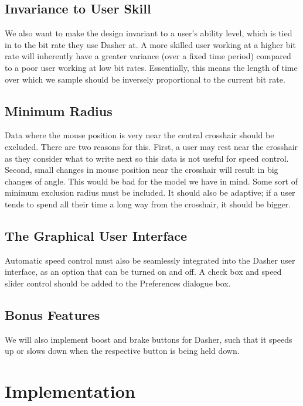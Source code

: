 \documentclass[a4paper,11pt,notitlepage]{article}
\begin{document}
\subsection{Invariance to User Skill}\label{item:bitr} 

We also want to make the design invariant to a user's ability level,
which is tied in to the bit rate they use Dasher at. A more skilled
user working at a higher bit rate will inherently have a greater
variance (over a fixed time period) compared to a poor user working at
low bit rates. Essentially, this means the length of time over which
we sample should be inversely proportional to the current bit rate.

\subsection{Minimum Radius}\label{item:minr} 

Data where the mouse position is very near the central crosshair
should be excluded. There are two reasons for this. First, a user may
rest near the crosshair as they consider what to write next so this
data is not useful for speed control. Second, small changes in mouse
position near the crosshair will result in big changes of angle. This
would be bad for the model we have in mind. Some sort of minimum
exclusion radius must be included. It should also be adaptive; if a
user tends to spend all their time a long way from the crosshair, it
should be bigger.

\subsection{The Graphical User Interface}\label{item:gui} 

Automatic speed control must also be seamlessly integrated into the
Dasher user interface, as an option that can be turned on and off. A
check box and speed slider control should be added to the Preferences
dialogue box.

\subsection{Bonus Features}

We will also implement boost and brake buttons for Dasher, such that
it speeds up or slows down when the respective button is being held
down.

\section{Implementation}
\end{document}
